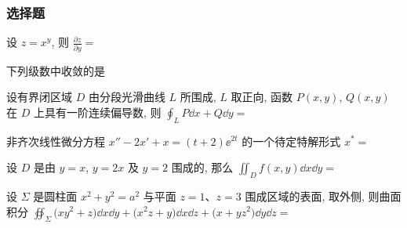 \subsubsection{选择题}
\begin{ti}
	设 $z = x^y$, 则 $\frac{\partial z}{\partial y} = $ \kuo
\end{ti}

\begin{ti}
	下列级数中收敛的是 \kuo
\end{ti}

\begin{ti}
	设有界闭区域 $D$ 由分段光滑曲线 $L$ 所围成, $L$ 取正向, 函数 $P(x,y)$, $Q(x,y)$ 在 $D$ 上具有一阶连续偏导数, 则 $\oint_L P \dd{x} + Q \dd{y} = $ \kuo
\end{ti}

\begin{ti}
	非齐次线性微分方程 $x'' - 2x' + x = (t + 2) \ee^{2t}$ 的一个待定特解形式 $x^* = $ \kuo
\end{ti}

\begin{ti}
	设 $D$ 是由 $y=x$, $y=2x$ 及 $y=2$ 围成的, 那么 $\iint_D f(x,y) \dd{x} \dd{y} = $ \kuo
\end{ti}

\begin{ti}
	设 $\Sigma$ 是圆柱面 $x^2 + y^2 = a^2$ 与平面 $z=1$、$z=3$ 围成区域的表面, 取外侧, 则曲面积分 $\oiint_\Sigma \bigl( xy^2 + z \bigr) \dd{x} \dd{y} + \bigl( x^2 z + y \bigr) \dd{x} \dd{z} + \bigl( x + yz^2 \bigr) \dd{y} \dd{z} = $ \kuo
\end{ti}

